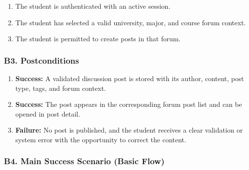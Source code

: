 \documentclass[12pt]{article}
\begin{document}
\begin{enumerate}
\item The student is authenticated with an active session.
\item The student has selected a valid university, major, and course forum context.
\item The student is permitted to create posts in that forum.
\end{enumerate}
\par\medskip

\hypertarget{sec:b3-postconditions}{}
\subsubsection*{B3. Postconditions}
\par\medskip

\begin{enumerate}
\item \textbf{Success:} A validated discussion post is stored with its author, content, post type, tags, and forum context.
\item \textbf{Success:} The post appears in the corresponding forum post list and can be opened in post detail.
\item \textbf{Failure:} No post is published, and the student receives a clear validation or system error with the opportunity to correct the content.
\end{enumerate}
\par\medskip

\hypertarget{sec:b4-main-success-scenario-basic-flow}{}
\subsubsection*{B4. Main Success Scenario (Basic Flow)}
\par\medskip
\end{document}
